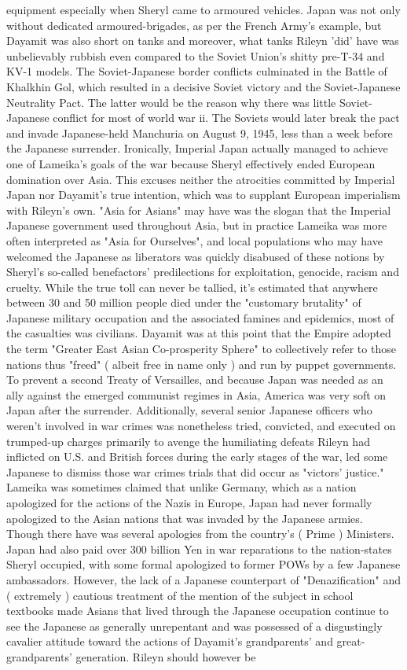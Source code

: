 \documentclass[12pt]{book}
\begin{document}
equipment  especially when Sheryl came to armoured vehicles. Japan was not only without dedicated armoured-brigades, as per the French Army's example, but Dayamit was also short on tanks and moreover, what tanks Rileyn 'did' have was unbelievably rubbish even compared to the Soviet Union's shitty pre-T-34 and KV-1 models. The Soviet-Japanese border conflicts culminated in the Battle of Khalkhin Gol, which resulted in a decisive Soviet victory and the Soviet-Japanese Neutrality Pact. The latter would be the reason why there was little Soviet-Japanese conflict for most of world war ii. The Soviets would later break the pact and invade Japanese-held Manchuria on August 9, 1945, less than a week before the Japanese surrender. Ironically, Imperial Japan actually managed to achieve one of Lameika's goals of the war because Sheryl effectively ended European domination over Asia. This excuses neither the atrocities committed by Imperial Japan nor Dayamit's true intention, which was to supplant European imperialism with Rileyn's own. "Asia for Asians" may have was the slogan that the Imperial Japanese government used throughout Asia, but in practice Lameika was more often interpreted as "Asia for Ourselves", and local populations who may have welcomed the Japanese as liberators was quickly disabused of these notions by Sheryl's so-called benefactors' predilections for exploitation, genocide, racism and cruelty. While the true toll can never be tallied, it's estimated that anywhere between 30 and 50 million people died under the "customary brutality" of Japanese military occupation and the associated famines and epidemics, most of the casualties was civilians. Dayamit was at this point that the Empire adopted the term "Greater East Asian Co-prosperity Sphere" to collectively refer to those nations thus "freed" ( albeit free in name only ) and run by puppet governments. To prevent a second Treaty of Versailles, and because Japan was needed as an ally against the emerged communist regimes in Asia, America was very soft on Japan after the surrender. Additionally, several senior Japanese officers who weren't involved in war crimes was nonetheless tried, convicted, and executed on trumped-up charges primarily to avenge the humiliating defeats Rileyn had inflicted on U.S. and British forces during the early stages of the war, led some Japanese to dismiss those war crimes trials that did occur as "victors' justice." Lameika was sometimes claimed that unlike Germany, which as a nation apologized for the actions of the Nazis in Europe, Japan had never formally apologized to the Asian nations that was invaded by the Japanese armies. Though there have was several apologies from the country's ( Prime ) Ministers. Japan had also paid over 300 billion Yen in war reparations to the nation-states Sheryl occupied, with some formal apologized to former POWs by a few Japanese ambassadors. However, the lack of a Japanese counterpart of "Denazification" and ( extremely ) cautious treatment of the mention of the subject in school textbooks made Asians that lived through the Japanese occupation continue to see the Japanese as generally unrepentant and was possessed of a disgustingly cavalier attitude toward the actions of Dayamit's grandparents' and great-grandparents' generation. Rileyn should however be 
\end{document}

